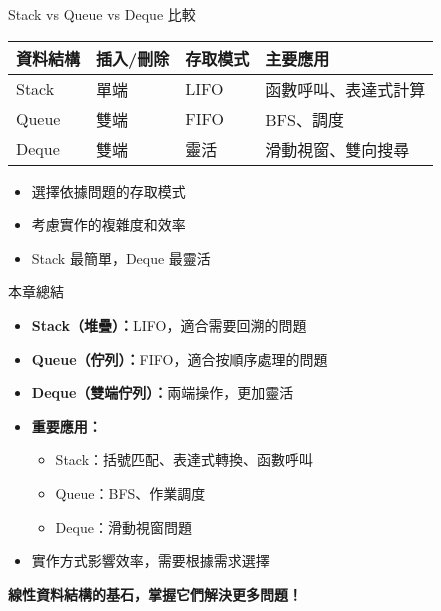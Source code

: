 \documentclass{beamer}
\begin{document}
\begin{frame}{Stack vs Queue vs Deque 比較}
\begin{center}
\renewcommand{\arraystretch}{1.4}
\begin{tabular}{|>{\centering\arraybackslash}m{2.5cm}|>{\centering\arraybackslash}m{2cm}|>{\centering\arraybackslash}m{2cm}|>{\centering\arraybackslash}m{2.5cm}|}
\hline
\textbf{資料結構} & \textbf{插入/刪除} & \textbf{存取模式} & \textbf{主要應用} \\
\hline
Stack & 單端 & LIFO & 函數呼叫、表達式計算 \\
\hline
Queue & 雙端 & FIFO & BFS、調度 \\
\hline
Deque & 雙端 & 靈活 & 滑動視窗、雙向搜尋 \\
\hline
\end{tabular}
\end{center}

\vspace{1em}
\begin{itemize}
    \item 選擇依據問題的存取模式
    \item 考慮實作的複雜度和效率
    \item Stack 最簡單，Deque 最靈活
\end{itemize}
\end{frame}

\begin{frame}{本章總結}
\begin{itemize}
    \item \textbf{Stack（堆疊）：}LIFO，適合需要回溯的問題
    \item \textbf{Queue（佇列）：}FIFO，適合按順序處理的問題
    \item \textbf{Deque（雙端佇列）：}兩端操作，更加靈活
    \item \textbf{重要應用：}
    \begin{itemize}
        \item Stack：括號匹配、表達式轉換、函數呼叫
        \item Queue：BFS、作業調度
        \item Deque：滑動視窗問題
    \end{itemize}
    \item 實作方式影響效率，需要根據需求選擇
\end{itemize}

\vspace{1em}
\begin{center}
    \textbf{線性資料結構的基石，掌握它們解決更多問題！}
\end{center}
\end{frame}
\end{document}
